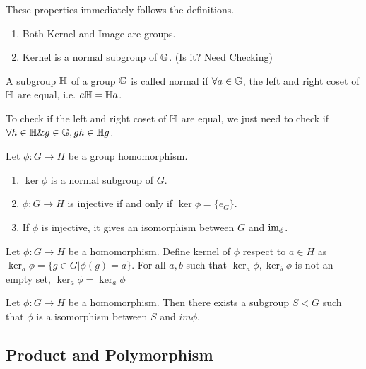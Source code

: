 \documentclass[../note.tex]{subfiles}
\begin{document}
\begin{theorem}
	These properties immediately follows the definitions.
	\begin{enumerate}
		\item Both Kernel and Image are groups.
		\item Kernel is a normal subgroup of $\mathbb{G}$. (Is it? Need Checking)
	\end{enumerate}
\end{theorem}


\begin{definition}
	A subgroup $\mathbb{H}$ of a group $\mathbb{G}$ is called normal if $\forall a \in \mathbb{G}$, the left and right coset of $\mathbb{H}$ are equal, i.e. $a \mathbb{H}=\mathbb{H}a$.
\end{definition}

To check if the left and right coset of $\mathbb{H}$ are equal, we just need to check if $\forall h \in \mathbb{H} \& g \in \mathbb{G}, gh \in \mathbb{H}g$.

\begin{theorem}
	Let $\phi : G \rightarrow H$ be a group homomorphism.
\begin{enumerate}
	\item $\ker{\phi}$ is a normal subgroup of $G$. 
	\item $\phi: G \rightarrow H$ is injective if and only if $\ker{\phi} = \{e_{G}\}$.
	\item If $\phi$ is injective, it gives an isomorphism between $G$ and $\text{im}_{\phi}$.
\end{enumerate}
\end{theorem}

\begin{hypothesis}
	Let $\phi: G \rightarrow H$ be a homomorphism.
	Define kernel of $\phi$ respect to $a \in H$ as $\ker_a{\phi}=\{g\in G| \phi(g)=a\}$.
	For all $a, b$ such that $\ker_a{\phi}, \ker_b{\phi}$ is not an empty set, $\ker_a{\phi}=\ker_a{\phi}$ 
\end{hypothesis}

\begin{hypothesis}
	Let $\phi: G \rightarrow H$ be a homomorphism. Then there exists a subgroup $S < G$ such that $\phi$ is a isomorphism between $S$ and $im \phi$.
\end{hypothesis}

\subsection{Product and Polymorphism}
\end{document}

